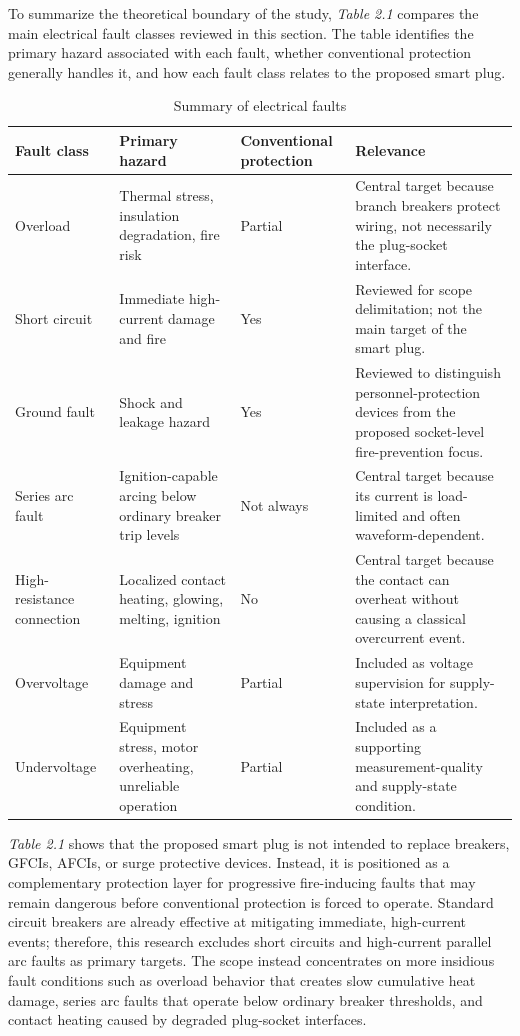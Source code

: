 To summarize the theoretical boundary of the study, \textit{Table 2.1} compares
the main electrical fault classes reviewed in this section. The table
identifies the primary hazard associated with each fault, whether
conventional protection generally handles it, and how each fault class
relates to the proposed smart plug.

\begin{table}[H]
  \centering
  \caption{Summary of electrical faults}
  \label{tab:ch2-fault-summary}
  \begin{tabular}{@{}p{}p{}p{}p{}@{}}
    \toprule
    \textbf{Fault class} & \textbf{Primary hazard} & \textbf{Conventional protection} & \textbf{Relevance} \\
    \midrule
    Overload & Thermal stress, insulation degradation, fire risk & Partial & Central target because branch breakers protect wiring, not necessarily the plug-socket interface. \\
    Short circuit & Immediate high-current damage and fire & Yes & Reviewed for scope delimitation; not the main target of the smart plug. \\
    Ground fault & Shock and leakage hazard & Yes & Reviewed to distinguish personnel-protection devices from the proposed socket-level fire-prevention focus. \\
    Series arc fault & Ignition-capable arcing below ordinary breaker trip levels & Not always & Central target because its current is load-limited and often waveform-dependent. \\
    High-resistance connection & Localized contact heating, glowing, melting, ignition & No & Central target because the contact can overheat without causing a classical overcurrent event. \\
    Overvoltage & Equipment damage and stress & Partial & Included as voltage supervision for supply-state interpretation. \\
    Undervoltage & Equipment stress, motor overheating, unreliable operation & Partial & Included as a supporting measurement-quality and supply-state condition. \\
    \bottomrule
  \end{tabular}
\end{table}

\textit{Table 2.1} shows that the proposed smart plug is not intended to replace
breakers, GFCIs, AFCIs, or surge protective devices. Instead, it is
positioned as a complementary protection layer for progressive
fire-inducing faults that may remain dangerous before conventional
protection is forced to operate. Standard circuit breakers are already
effective at mitigating immediate, high-current events; therefore, this
research excludes short circuits and high-current parallel arc faults as
primary targets. The scope instead concentrates on more insidious fault
conditions such as overload behavior that creates slow cumulative heat
damage, series arc faults that operate below ordinary breaker
thresholds, and contact heating caused by degraded plug-socket
interfaces.

